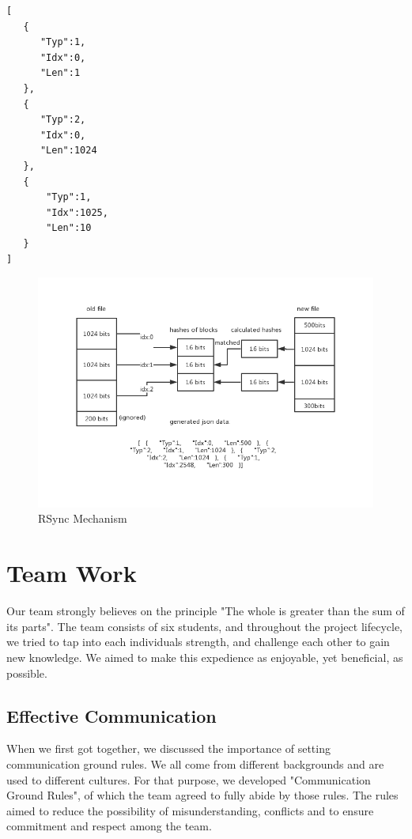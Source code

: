 \documentclass{article}
\begin{document}
\begin{lstlisting}
[
   {
      "Typ":1,
      "Idx":0,
      "Len":1
   },
   {
      "Typ":2,
      "Idx":0,
      "Len":1024
   },
   {
       "Typ":1,
       "Idx":1025,
       "Len":10
   }
]

\end{lstlisting}

 \begin{figure}[H]
     \centering
     \includegraphics[width=1.1\textwidth]{reassembling-stage}
     \caption{RSync Mechanism}
     \label{fig:reassembling-stage}
 \end{figure}


\section{Team Work}
Our team strongly believes on the principle "The whole is greater than the sum of its parts". The team consists of six students, and throughout the project lifecycle, we tried to tap into each individuals strength, and challenge each other to gain new knowledge. We aimed to make this expedience as enjoyable, yet beneficial, as possible.

\subsection{Effective Communication}
When we first got together, we discussed the importance of setting communication ground rules. We all come from different backgrounds and are used to different cultures. For that purpose, we developed "Communication Ground Rules", of which the team agreed to fully abide by those rules. The rules aimed to reduce the possibility of misunderstanding, conflicts and to ensure commitment and respect among the team.
\end{document}
